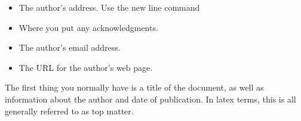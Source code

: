 	\begin{itemize}
		\item  The author's address.  Use
		the new line command
		\item Where you put any acknowledgments.
		\item The author's email address.
		\item The URL for the author's web page.
	\end{itemize}

	The first thing you normally have is a title of the document, as well as
	information about the author and date of publication. In latex terms,
	this is all generally referred to as top matter.
	
